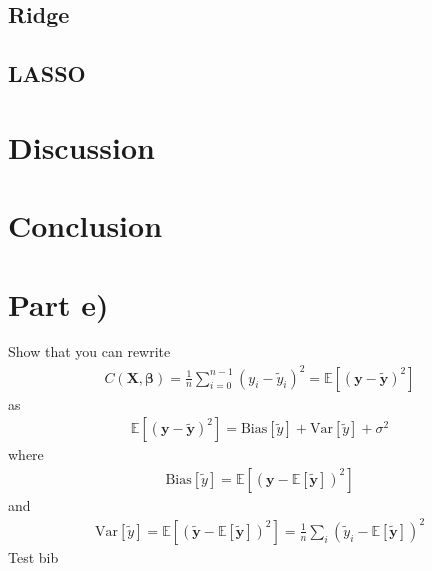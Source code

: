 \documentclass[%
reprint,
amsmath,amssymb,
aps,
]{revtex4-2}
\begin{document}
\subsection{Ridge}

\subsection{LASSO}

\section{Discussion}

\section{Conclusion}

\section*{Part e)}
Show that you can rewrite
\begin{align*}
	C(\bm X,\bm \beta)=\frac{1}{n}\sum_{i=0}^{n-1}(y_i-\tilde y_i)^2=\mathbb{E}[(\bm y-\tilde{\bm y})^2]
\end{align*}
as
\begin{align*}
	\mathbb{E}[(\bm y-\tilde{\bm y})^2]=\text{Bias}[\tilde y]+\text{Var}[\tilde{y}]+\sigma^2
\end{align*}
where
\begin{align*}
	\text{Bias}[\tilde y]=\mathbb{E}\!\left[(\bm y-\mathbb{E}[\tilde{\bm y}])^2\right]
\end{align*}
and
\begin{align*}
	\text{Var}[\tilde{y}]=\mathbb{E}\!\left[(\tilde{\bm y}-\mathbb{E}[\tilde{\bm y}])^2\right]=\frac{1}{n}\sum_i(\tilde y_i-\mathbb{E}[\tilde{\bm y}])^2
\end{align*}
Test bib \cite{Planck:2018vyg}



	
\end{document}
